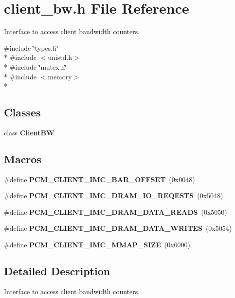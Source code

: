 \section{client\+\_\+bw.\+h File Reference}
\label{client__bw_8h}


Interface to access client bandwidth counters.  


{\ttfamily \#include \char`\"{}types.\+h\char`\"{}}\\*
{\ttfamily \#include $<$unistd.\+h$>$}\\*
{\ttfamily \#include \char`\"{}mutex.\+h\char`\"{}}\\*
{\ttfamily \#include $<$memory$>$}\\*
\subsection*{Classes}
\begin{DoxyCompactItemize}
\item 
class {\bf Client\+BW}
\end{DoxyCompactItemize}
\subsection*{Macros}
\begin{DoxyCompactItemize}
\item 
\#define {\bfseries P\+C\+M\+\_\+\+C\+L\+I\+E\+N\+T\+\_\+\+I\+M\+C\+\_\+\+B\+A\+R\+\_\+\+O\+F\+F\+S\+ET}~(0x0048)\label{client__bw_8h_aa16cd48b0adede371be77dbc0be2fd9b}

\item 
\#define {\bfseries P\+C\+M\+\_\+\+C\+L\+I\+E\+N\+T\+\_\+\+I\+M\+C\+\_\+\+D\+R\+A\+M\+\_\+\+I\+O\+\_\+\+R\+E\+Q\+E\+S\+TS}~(0x5048)\label{client__bw_8h_a2afb60758e870c73eec7e100b6040b47}

\item 
\#define {\bfseries P\+C\+M\+\_\+\+C\+L\+I\+E\+N\+T\+\_\+\+I\+M\+C\+\_\+\+D\+R\+A\+M\+\_\+\+D\+A\+T\+A\+\_\+\+R\+E\+A\+DS}~(0x5050)\label{client__bw_8h_a125dc536cbcf631a395c40a183645e89}

\item 
\#define {\bfseries P\+C\+M\+\_\+\+C\+L\+I\+E\+N\+T\+\_\+\+I\+M\+C\+\_\+\+D\+R\+A\+M\+\_\+\+D\+A\+T\+A\+\_\+\+W\+R\+I\+T\+ES}~(0x5054)\label{client__bw_8h_aca3e4d8c51b41ea7c8465d3f89659796}

\item 
\#define {\bfseries P\+C\+M\+\_\+\+C\+L\+I\+E\+N\+T\+\_\+\+I\+M\+C\+\_\+\+M\+M\+A\+P\+\_\+\+S\+I\+ZE}~(0x6000)\label{client__bw_8h_aa0e78fbc5472bbfb796c575dd9c33dba}

\end{DoxyCompactItemize}


\subsection{Detailed Description}
Interface to access client bandwidth counters. 

